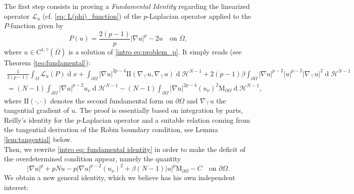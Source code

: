 \documentclass[10pt,a4paper, reqno]{amsart}
\numberwithin{equation}{section}
\renewcommand{\d}[1]{\ensuremath{\operatorname{d}\!{#1}}}
\begin{document}
The first step consists in proving a \textit{Fundamental Identity} regarding the linearized operator $\mathcal{L}_u$ (cf. \eqref{eq: L(phi)_function}) of the $p$-Laplacian operator applied to the $P$-function given by
\begin{equation}\label{intro eq:P_function p}
    P(u) = \frac{2(p-1)}{p}|\nabla u|^p - 2u \quad \text{on } \overline{\Omega},
\end{equation}
where $u \in C^{1,\gamma}(\overline{\Omega})$ is a solution of \eqref{intro eq:problem_p}. It simply reads (see Theorem \ref{teo:fundamental}):
\begin{equation}\label{intro eq: fundamental identity}
    \begin{aligned}
    \frac{1}{2(p-1)}\int_\Omega \mathcal{L}_u(P) \d{x} +\int_{\partial\Omega} |\nabla u|^{2p-4} \mathrm{I\!I}(\nabla_\top u,\nabla_\top u) \d{}\mathcal{H}^{N-1}+ 2(p-1) \beta\int_{\partial\Omega} |\nabla u|^{p-2}|u|^{p-2}|\nabla_\top u|^2 \d{}\mathcal{H}^{N-1} \\= (N-1) \int_{\partial\Omega} |\nabla u|^{p-2} u_\nu \d{}\mathcal{H}^{N-1}
    - (N-1) \int_{\partial\Omega} |\nabla u|^{2p-4} (u_\nu)^2 \mathrm{M}_{\partial\Omega} \d{}\mathcal{H}^{N-1},
    \end{aligned}
\end{equation}
where $\mathrm{I\!I}(\cdot,\cdot)$ denotes the second fundamental form on $\partial\Omega$ and $\nabla_\top u$ the tangential gradient of $u$. The proof is essentially based on integration by parts, Reilly's identity for the $p$-Laplacian operator and a suitable relation coming from the tangential derivation of the Robin boundary condition, see Lemma \ref{lem:tangential} below.
\\
Then, we rewrite \eqref{intro eq: fundamental identity} in order to make the deficit of the overdetermined condition appear, namely the quantity
\begin{equation*}
    |\nabla u|^p + pNu - p |\nabla u|^{p-2} (u_\nu)^2 + \beta(N-1) |u|^p \mathrm{M}_{\partial\Omega} - C  \quad\text{on } \partial\Omega.
\end{equation*}
We obtain a new general identity, which we believe has his own independent interest:
\end{document}
